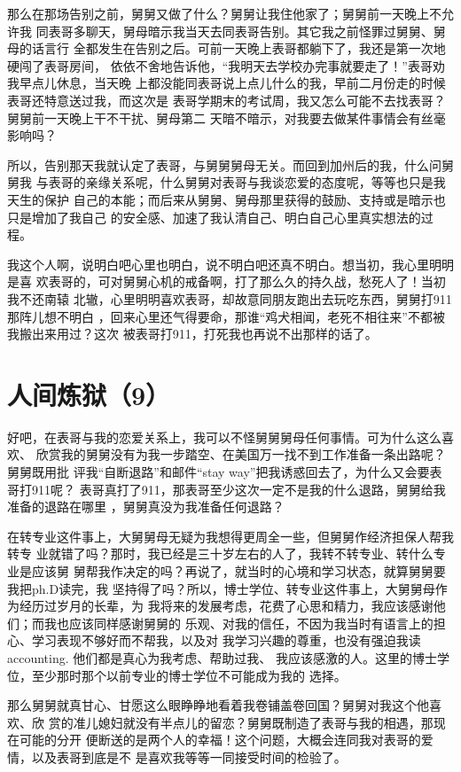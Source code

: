 \documentclass[12pt]{book}
\begin{document}
那么在那场告别之前，舅舅又做了什么？舅舅让我住他家了；舅舅前一天晚上不允许我
同表哥多聊天，舅母暗示我当天去同表哥告别。其它我之前怪罪过舅舅、舅母的话言行
全都发生在告别之后。可前一天晚上表哥都躺下了，我还是第一次地硬闯了表哥房间，
依依不舍地告诉他，“我明天去学校办完事就要走了！”表哥劝我早点儿休息，当天晚
上都没能同表哥说上点儿什么的我，早前二月份走的时候表哥还特意送过我，而这次是
表哥学期末的考试周，我又怎么可能不去找表哥？舅舅前一天晚上干不干扰、舅母第二
天暗不暗示，对我要去做某件事情会有丝毫影响吗？

所以，告别那天我就认定了表哥，与舅舅舅母无关。而回到加州后的我，什么问舅舅我
与表哥的亲缘关系呢，什么舅舅对表哥与我谈恋爱的态度呢，等等也只是我天生的保护
自己的本能；而后来从舅舅、舅母那里获得的鼓励、支持或是暗示也只是增加了我自己
的安全感、加速了我认清自己、明白自己心里真实想法的过程。

我这个人啊，说明白吧心里也明白，说不明白吧还真不明白。想当初，我心里明明是喜
欢表哥的，可对舅舅心机的戒备啊，打了那么久的持久战，愁死人了！当初我不还南辕
北辙，心里明明喜欢表哥，却故意同朋友跑出去玩吃东西，舅舅打911那阵儿想不明白
，回来心里还气得要命，那谁“鸡犬相闻，老死不相往来”不都被我搬出来用过？这次
被表哥打911，打死我也再说不出那样的话了。
\section{人间炼狱（9）}
\label{sec-10-9}

好吧，在表哥与我的恋爱关系上，我可以不怪舅舅舅母任何事情。可为什么这么喜欢、
欣赏我的舅舅没有为我一步踏空、在美国万一找不到工作准备一条出路呢？舅舅既用批
评我“自断退路”和邮件“stay way”把我诱惑回去了，为什么又会要表哥打911呢？
表哥真打了911，那表哥至少这次一定不是我的什么退路，舅舅给我准备的退路在哪里
，舅舅真没为我准备任何退路？

在转专业这件事上，大舅舅母无疑为我想得更周全一些，但舅舅作经济担保人帮我转专
业就错了吗？那时，我已经是三十岁左右的人了，我转不转专业、转什么专业是应该舅
舅帮我作决定的吗？再说了，就当时的心境和学习状态，就算舅舅要我把ph.D读完，我
坚持得了吗？所以，博士学位、转专业这件事上，大舅舅母作为经历过岁月的长辈，为
我将来的发展考虑，花费了心思和精力，我应该感谢他们；而我也应该同样感谢舅舅的
乐观、对我的信任，不因为我当时有语言上的担心、学习表现不够好而不帮我，以及对
我学习兴趣的尊重，也没有强迫我读accounting. 他们都是真心为我考虑、帮助过我、
我应该感激的人。这里的博士学位，至少那时那个以前专业的博士学位不可能成为我的
选择。

那么舅舅就真甘心、甘愿这么眼睁睁地看着我卷铺盖卷回国？舅舅对我这个他喜欢、欣
赏的准儿媳妇就没有半点儿的留恋？舅舅既制造了表哥与我的相遇，那现在可能的分开
便断送的是两个人的幸福！这个问题，大概会连同我对表哥的爱情，以及表哥到底是不
是喜欢我等等一同接受时间的检验了。
\end{document}
